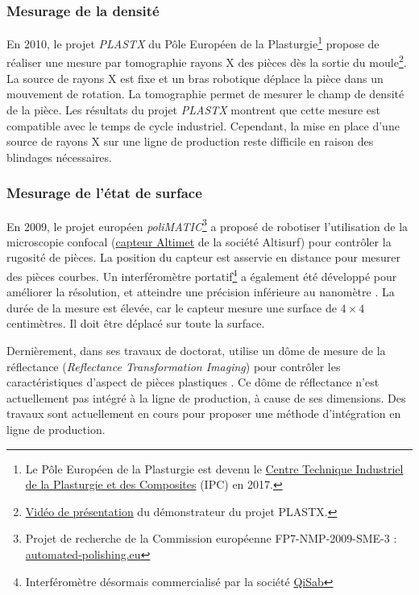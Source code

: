 \subsubsection{Mesurage de la densité}
En 2010, le projet \textit{PLASTX} du Pôle Européen de la Plasturgie\footnote{Le Pôle Européen de la Plasturgie est devenu le \href{https://ct-ipc.com/}{Centre Technique Industriel de la Plasturgie et des Composites} (IPC) en 2017.} propose de réaliser une mesure par tomographie rayons X des pièces dès la sortie du moule\footnote{\href{https://vimeo.com/50358748}{Vidéo de présentation} du démonstrateur du projet PLASTX.}.
La source de rayons X est fixe et un bras robotique déplace la pièce dans un mouvement de rotation.
La tomographie permet de mesurer le champ de densité de la pièce.  %
Les résultats du projet \textit{PLASTX} montrent que cette mesure est compatible avec le temps de cycle industriel.
Cependant, la mise en place d'une source de rayons X sur une ligne de production reste difficile en raison des blindages nécessaires.

\subsubsection{Mesurage de l'état de surface}
En 2009, le projet européen \textit{poliMATIC}\footnote{Projet de recherche de la Commission européenne FP7-NMP-2009-SME-3 : \href{https://www.automated-polishing.eu/}{automated-polishing.eu}} a proposé de robotiser l'utilisation de la microscopie confocal (\href{https://www.altimet.fr/?page_id=248}{capteur Altimet} de la société Altisurf) pour contrôler la rugosité de pièces.
La position du capteur est asservie en distance pour mesurer des pièces courbes.
Un interféromètre portatif\footnote{Interféromètre désormais commercialisé par la société \href{http://qisab.com/}{QiSab}} a également été développé pour améliorer la résolution, et atteindre une précision inférieure au nanomètre \cite{baath_new_2012}.
La durée de la mesure est élevée, car le capteur mesure une surface de $4\times 4$ centimètres.
Il doit être déplacé sur toute la surface.

Dernièrement, dans ses travaux de doctorat, \citeauthor{lacombe_exploitation_2018a} utilise un dôme de mesure de la réflectance (\textit{Reflectance Transformation Imaging}) pour contrôler les caractéristiques d'aspect de pièces plastiques \cite{lacombe_exploitation_2018a}.
Ce dôme de réflectance n'est actuellement pas intégré à la ligne de production, à cause de ses dimensions.
Des travaux sont actuellement en cours pour proposer une méthode d'intégration en ligne de production.

